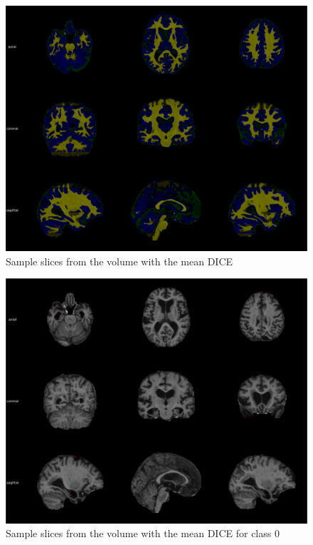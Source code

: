\documentclass[msc]{infthesis}
\begin{document}
\begin{figure}[ht]
  \centering
  \includegraphics[width=\textwidth]{images/overall_mean}
  \caption{Sample slices from the volume with the mean DICE}
  \label{fig:overall-max-dice}
\end{figure}


\begin{figure}[ht]
  \centering
  \includegraphics[width=\textwidth]{images/class_0_mean}
  \caption{Sample slices from the volume with the mean DICE for class 0}
  \label{fig:overall-mean-0}
\end{figure}
\end{document}
